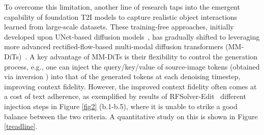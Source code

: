 \documentclass{article}
\begin{document}
To overcome this limitation, another line of research taps into the emergent capability of foundation T2I models to capture realistic object interactions learned from large-scale datasets.
{These training-free approaches, initially developed upon UNet-based diffusion models~\citep{hertz2022prompt, cao2023masactrl, tumanyan2023plug}, has gradually shifted to leveraging more advanced rectified-flow-based multi-modal diffusion transformers (MM-DiTs)~\citep{rout2024semantic, wang2024taming, deng2024fireflow, tewel2025addit, zhu2025kv}.
A key advantage of MM-DiTs is their flexibility to control the generation process, e.g., one can inject the query/key/value of source-image tokens (obtained via inversion \citep{deng2024fireflow,rout2024semantic,wang2024taming}) into that of the generated tokens at each denoising timestep, improving context fidelity.}
However, the improved context fidelity often comes at a cost of text adherence, as exemplified by results of RFSolver-Edit~\citep{wang2024taming} different injection steps in  Figure \ref{fig2} (b.1-b.5), where it is unable to strike a good balance between the two criteria. A quantitative study on this is shown in Figure \ref{treadline}.
\end{document}
